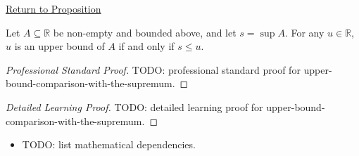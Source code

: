 \newpage
{}
\label{prf:upper-bound-comparison-with-the-supremum}

\begin{remark*}[Return]
\hyperref[prop:upper-bound-comparison-with-the-supremum]{Return to Proposition}
\end{remark*}

\begin{proposition*}
Let $A \subseteq \mathbb{R}$ be non-empty and bounded above, and let $s = \sup A$. For any $u \in \mathbb{R}$, $u$ is an upper bound of $A$ if and only if $s \le u$.
\end{proposition*}

\begin{proof}[Professional Standard Proof]
\LRAProofBodyStart
TODO: professional standard proof for upper-bound-comparison-with-the-supremum.
\end{proof}

\begin{proof}[Detailed Learning Proof]
\LRAProofBodyStart
TODO: detailed learning proof for upper-bound-comparison-with-the-supremum.
\end{proof}

\begin{remark*}
\end{remark*}

\begin{dependencies}
\begin{itemize}
  \item TODO: list mathematical dependencies.
\end{itemize}
\end{dependencies}

\clearpage
